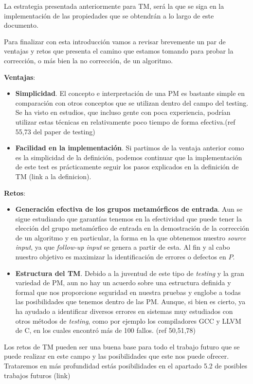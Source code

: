 La estrategia presentada anteriormente para TM, será la que se siga en la implementación de las propiedades que se obtendrán a lo largo de este documento. \newline

Para finalizar con esta introducción vamos a revisar brevemente un par de ventajas y retos que presenta el camino que estamos tomando para probar la corrección, o más bien la no corrección, de un algoritmo. \newpage

\textbf{Ventajas}:
\begin{itemize}
    \item \textbf{Simplicidad}. El concepto e interpretación de una PM es bastante simple en comparación con otros conceptos que se utilizan dentro del campo del testing. Se ha visto en estudios, que incluso gente con poca experiencia, podrían utilizar estas técnicas en relativamente poco tiempo de forma efectiva.(ref 55,73 del paper de testing)
    \item \textbf{Facilidad en la implementación}. Si partimos de la ventaja anterior como es la simplicidad de la definición, podemos continuar que la implementación de este test es prácticamente seguir los pasos explicados en la definición de TM (link a la definicion).
\end{itemize}

\vspace{10pt}

\textbf{Retos}:
\begin{itemize}
    \item \textbf{Generación efectiva de los grupos metamórficos de entrada}. Aun se sigue estudiando que garantías tenemos en la efectividad que puede tener la elección del grupo metamórfico de entrada en la demostración de la corrección de un algoritmo y en particular, la forma en la que obtenemos nuestro \textit{source input}, ya que \textit{follow-up input} se genera a partir de esta. Al fin y al cabo nuestro objetivo es maximizar la identificación de errores o defectos en $P$.
    
    \item \textbf{Estructura del TM}. Debido a la juventud de este tipo de \textit{testing} y la gran variedad de PM, aun no hay un acuerdo sobre una estructura definida y formal que nos proporcione seguridad en nuestra pruebas y englobe a todas las posibilidades que tenemos dentro de las PM. Aunque, si bien es cierto, ya ha ayudado a identificar diversos errores en sistemas muy estudiados con otros métodos de \textit{testing}, como por ejemplo los compiladores GCC y LLVM de C, en los cuales encontró más de 100 fallos. (ref 50,51,78)
\end{itemize}

Los retos de TM pueden ser una buena base para todo el trabajo futuro que se puede realizar en este campo y las posibilidades que este nos puede ofrecer. Trataremos en más profundidad estás posibilidades en el apartado 5.2 de posibles trabajos futuros (link)



